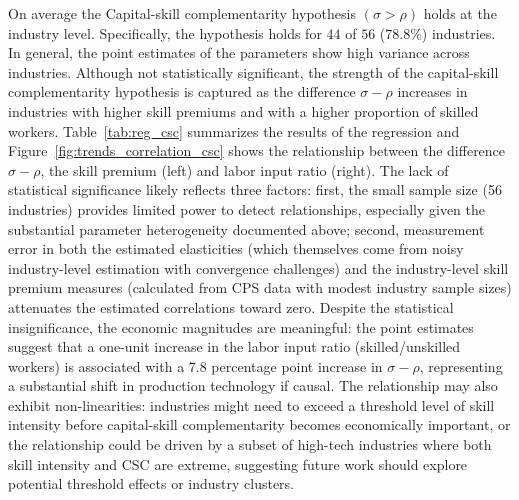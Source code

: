 \documentclass[12pt]{article}
\begin{document}
On average the Capital-skill complementarity hypothesis $(\sigma > \rho)$ holds at the industry level.
Specifically, the hypothesis holds for $44$ of $56$ ($78.8\%$) industries. In general, the point estimates of the parameters show high variance across industries. Although not statistically significant, the strength of the capital-skill complementarity hypothesis is captured as the difference $\sigma - \rho$ increases in industries with higher skill premiums and with a higher proportion of skilled workers. Table~\ref{tab:reg_csc} summarizes the results of the regression and Figure~\ref{fig:trends_correlation_csc} shows the relationship between the difference $\sigma - \rho$, the skill premium (left) and labor input ratio (right). The lack of statistical significance likely reflects three factors: first, the small sample size (56 industries) provides limited power to detect relationships, especially given the substantial parameter heterogeneity documented above; second, measurement error in both the estimated elasticities (which themselves come from noisy industry-level estimation with convergence challenges) and the industry-level skill premium measures (calculated from CPS data with modest industry sample sizes) attenuates the estimated correlations toward zero. Despite the statistical insignificance, the economic magnitudes are meaningful: the point estimates suggest that a one-unit increase in the labor input ratio (skilled/unskilled workers) is associated with a 7.8 percentage point increase in $\sigma - \rho$, representing a substantial shift in production technology if causal. The relationship may also exhibit non-linearities: industries might need to exceed a threshold level of skill intensity before capital-skill complementarity becomes economically important, or the relationship could be driven by a subset of high-tech industries where both skill intensity and CSC are extreme, suggesting future work should explore potential threshold effects or industry clusters.
\end{document}
